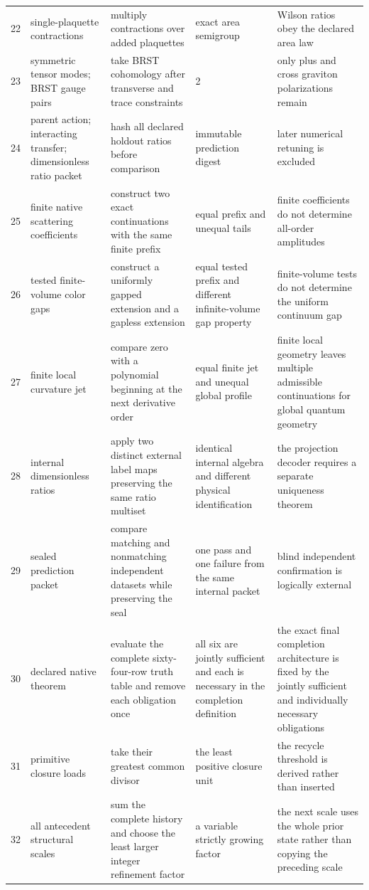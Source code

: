 \documentclass[11pt]{article}
\numberwithin{equation}{section}
\theoremstyle{remark}
\begin{document}
\begin{landscape}
\begin{longtable}{p{0.65cm}p{3.5cm}p{4.0cm}p{4.0cm}p{4.6cm}}
22&single-plaquette contractions&multiply contractions over added plaquettes&exact area semigroup&Wilson ratios obey the declared area law\\
23&symmetric tensor modes; BRST gauge pairs&take BRST cohomology after transverse and trace constraints&2&only plus and cross graviton polarizations remain\\
24&parent action; interacting transfer; dimensionless ratio packet&hash all declared holdout ratios before comparison&immutable prediction digest&later numerical retuning is excluded\\
25&finite native scattering coefficients&construct two exact continuations with the same finite prefix&equal prefix and unequal tails&finite coefficients do not determine all-order amplitudes\\
26&tested finite-volume color gaps&construct a uniformly gapped extension and a gapless extension&equal tested prefix and different infinite-volume gap property&finite-volume tests do not determine the uniform continuum gap\\
27&finite local curvature jet&compare zero with a polynomial beginning at the next derivative order&equal finite jet and unequal global profile&finite local geometry leaves multiple admissible continuations for global quantum geometry\\
28&internal dimensionless ratios&apply two distinct external label maps preserving the same ratio multiset&identical internal algebra and different physical identification&the projection decoder requires a separate uniqueness theorem\\
29&sealed prediction packet&compare matching and nonmatching independent datasets while preserving the seal&one pass and one failure from the same internal packet&blind independent confirmation is logically external\\
30&declared native theorem&evaluate the complete sixty-four-row truth table and remove each obligation once&all six are jointly sufficient and each is necessary in the completion definition&the exact final completion architecture is fixed by the jointly sufficient and individually necessary obligations\\
31&primitive closure loads&take their greatest common divisor&the least positive closure unit&the recycle threshold is derived rather than inserted\\
32&all antecedent structural scales&sum the complete history and choose the least larger integer refinement factor&a variable strictly growing factor&the next scale uses the whole prior state rather than copying the preceding scale\\

\end{longtable}
\end{landscape}
\end{document}
